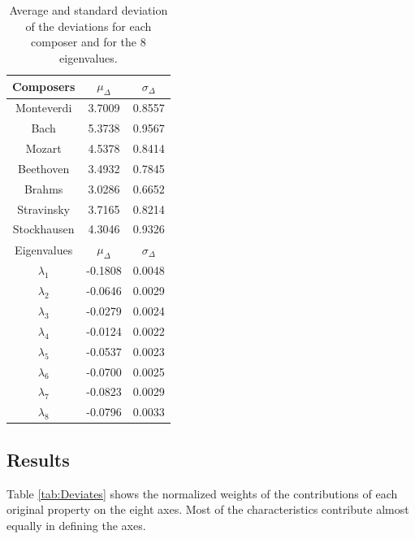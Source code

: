 \documentclass[
 aip,
 jmp,
 amsmath,amssymb,
 reprint,
]{revtex4-1}
\begin{document}
\begin{table}%
\caption{\label{tab:tableD}Average and standard deviation of the 
deviations for each composer and for the 
8 eigenvalues.}

\begin{tabular}{|c||c|c|}
\hline

Composers & $\mu_{\Delta}$ & $\sigma_{\Delta}$ \\
\hline

Monteverdi     & 3.7009 & 0.8557 \\
Bach           & 5.3738 & 0.9567 \\
Mozart         & 4.5378 & 0.8414 \\
Beethoven      & 3.4932 & 0.7845 \\
Brahms         & 3.0286 & 0.6652 \\
Stravinsky     & 3.7165 & 0.8214 \\
Stockhausen    & 4.3046 & 0.9326 \\
\hline \hline
Eigenvalues & $\mu_{\Delta}$ & $\sigma_{\Delta}$ \\
\hline
$\lambda_1$ &  -0.1808 & 0.0048 \\
$\lambda_2$ &  -0.0646 & 0.0029 \\
$\lambda_3$ &  -0.0279 & 0.0024 \\
$\lambda_4$ &  -0.0124 & 0.0022 \\
$\lambda_5$ &  -0.0537 & 0.0023 \\
$\lambda_6$ &  -0.0700 & 0.0025 \\
$\lambda_7$ &  -0.0823 & 0.0029 \\
$\lambda_8$ &  -0.0796 & 0.0033 \\
\hline

\end{tabular}
\end{table}

\subsection{Results}

Table \ref{tab:Deviates} shows the normalized weights
of the contributions of each original property on the eight
axes. Most of the characteristics contribute almost equally
in defining the axes. 
\end{document}
